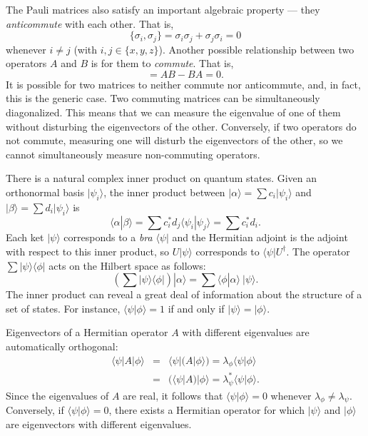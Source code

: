 \documentclass{report}
\newcommand{\ket}[1]{|{#1}\rangle}
\newcommand{\bra}[1]{\langle{#1}|}
\newcommand{\Sum}{\sum}
\begin{document}
The Pauli matrices also satisfy an important algebraic property --- they 
{\em anticommute} with each other.  That is,
\begin{equation}
\{\sigma_i, \sigma_j \} = \sigma_i \sigma_j + \sigma_j \sigma_i = 0
\end{equation}
whenever $i \neq j$ (with $i, j \in \{ x, y, z \}$).  Another possible 
relationship between two operators $A$ and $B$ is for them to {\em 
commute}.  That is,
\begin{equation}
[A, B] = A B - B A = 0.
\end{equation}
It is possible for two matrices to neither commute nor anticommute, and, 
in fact, this is the generic case.  Two commuting matrices can be 
simultaneously diagonalized.  This means that we can measure the 
eigenvalue of one of them without disturbing the eigenvectors of the other.  
Conversely, if two operators do not commute, measuring one will disturb 
the eigenvectors of the other, so we cannot simultaneously measure 
non-commuting operators.

There is a natural complex inner product on quantum states.  Given an
orthonormal basis $\ket{\psi_i}$, the inner product between $\ket{\alpha} 
= \Sum c_i \ket{\psi_i}$ and $\ket{\beta} = \Sum d_i \ket{\psi_i}$ is
\begin{equation}
\langle \alpha \ket{\beta} = \Sum c_i^* d_j \langle \psi_i \ket{\psi_j}
= \Sum c_i^* d_i.
\end{equation}
Each ket $\ket{\psi}$ corresponds to a {\em bra} $\bra{\psi}$ and the 
Hermitian adjoint is the adjoint with respect to this inner product, so
$U \ket{\psi}$ corresponds to $\bra{\psi} U^\dagger$.  The operator  
$\Sum \ket{\psi} \bra{\phi}$ acts on the Hilbert space as follows:
\begin{equation}
\left( \Sum \ket{\psi} \bra{\phi} \right) \ket{\alpha} =
\Sum \langle \phi \ket{\alpha} \ \ket{\psi}.
\end{equation}
The inner product can reveal a great deal of information about the
structure of a set of states.  For instance, $\langle \psi \ket{\phi} = 1$
if and only if $\ket{\psi} = \ket{\phi}$.

Eigenvectors of a Hermitian operator $A$ with different eigenvalues are 
automatically orthogonal:
\begin{eqnarray}
\bra{\psi} A \ket{\phi} & = & \bra{\psi} \big( A \ket{\phi} \big) = 
\lambda_{\phi} \langle \psi \ket{\phi} \\
& = & \big( \bra{\psi} A \big) \ket{\phi} = \lambda_{\psi}^* \langle \psi 
\ket{\phi}.
\end{eqnarray}
Since the eigenvalues of $A$ are real, it follows that 
$\langle \psi \ket{\phi} = 0$ whenever $\lambda_{\phi} \neq \lambda_{\psi}$.  
Conversely, if $\langle \psi \ket{\phi} = 0$, there exists a Hermitian operator 
for which $\ket{\psi}$ and $\ket{\phi}$ are eigenvectors with different 
eigenvalues.
\end{document}
